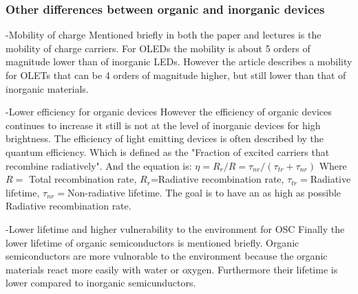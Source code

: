 \subsubsection{Other differences between organic and inorganic devices}
-Mobility of charge
Mentioned briefly in both the paper and lectures is the mobility of charge carriers. For OLEDs the mobility is about 5 orders of magnitude lower than of inorganic LEDs. However the article describes a mobility for OLETs that can be 4 orders of magnitude higher, but still lower than that of inorganic materials.

-Lower efficiency for organic devices
However the efficiency of organic devices continues to increase it still is not at the level of inorganic devices for high brightness. The efficiency of light emitting devices is often described by the quantum efficiency. Which is defined as the "Fraction of excited carriers that recombine radiatively". And the equation is: $\eta = R_{r}/R = \tau_{nr}/(\tau_{tr}+\tau_{nr})$ Where $R=$ Total recombination rate, $R_{r}$=Radiative recombination rate, $\tau_{tr}=$Radiative lifetime, $\tau_{nr}=$Non-radiative lifetime. The goal is to have an as high as possible Radiative recombination rate. 

-Lower lifetime and higher vulnerability to the environment for OSC
Finally the lower lifetime of organic semiconductors is mentioned briefly. Organic semiconductors are more vulnorable to the environment because the organic materials react more easily with water or oxygen. Furthermore their lifetime is lower compared to inorganic semicunductors. 
